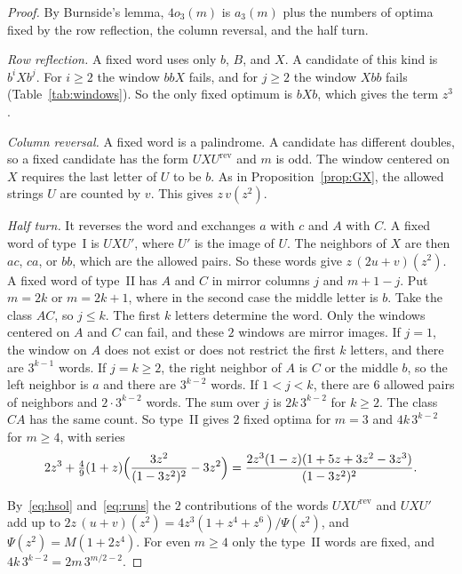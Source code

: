 \begin{proof}
By Burnside's lemma, $4o_3(m)$ is $a_3(m)$ plus the numbers of optima fixed by
the row reflection, the column reversal, and the half turn.

\emph{Row reflection.} A fixed word uses only $b$, $B$, and $X$. A candidate of
this kind is $b^iXb^j$. For $i\ge2$ the window $bbX$ fails, and for $j\ge2$ the
window $Xbb$ fails (Table~\ref{tab:windows}). So the only fixed optimum is
$bXb$, which gives the term $z^3$.

\emph{Column reversal.} A fixed word is a palindrome. A candidate has
different doubles, so a fixed candidate has the form $UXU^{\mathrm{rev}}$ and
$m$ is odd. The window centered on $X$ requires the last letter of $U$ to be
$b$. As in Proposition~\ref{prop:GX}, the allowed strings $U$ are counted by
$v$. This gives $z\,v(z^2)$.

\emph{Half turn.} It reverses the word and exchanges $a$ with $c$ and $A$ with
$C$. A fixed word of type~I is $UXU'$, where $U'$ is the image of $U$. The
neighbors of $X$ are then $ac$, $ca$, or $bb$, which are the allowed pairs. So
these words give $z\,(2u+v)(z^2)$. A fixed word of type~II has $A$ and $C$ in
mirror columns $j$ and $m+1-j$. Put $m=2k$ or $m=2k+1$, where in the second
case the middle letter is $b$. Take the class $AC$, so $j\le k$. The first $k$
letters determine the word. Only the windows centered on $A$ and $C$ can fail,
and these $2$ windows are mirror images. If $j=1$, the window on $A$ does not
exist or does not restrict the first $k$ letters, and there are $3^{k-1}$
words. If $j=k\ge2$, the right neighbor of $A$ is $C$ or the middle $b$, so the
left neighbor is $a$ and there are $3^{k-2}$ words. If $1<j<k$, there are
$6$ allowed pairs of neighbors and $2\cdot3^{k-2}$ words. The sum over $j$ is
$2k\,3^{k-2}$ for $k\ge2$. The class $CA$ has the same count. So type~II
gives $2$ fixed optima for $m=3$ and $4k\,3^{k-2}$ for $m\ge4$, with series
\[
2z^3+\tfrac49(1+z)\Bigl(\frac{3z^2}{(1-3z^2)^2}-3z^2\Bigr)
=\frac{2z^3(1-z)(1+5z+3z^2-3z^3)}{(1-3z^2)^2}.
\]

By~\eqref{eq:hsol} and~\eqref{eq:runs} the $2$ contributions of the words
$UXU^{\mathrm{rev}}$ and $UXU'$ add up to
$2z\,(u+v)(z^2)=4z^3(1+z^4+z^6)/\Psi(z^2)$, and $\Psi(z^2)=M(1+2z^4)$. For even
$m\ge4$ only the type~II words are fixed, and $4k\,3^{k-2}=2m\,3^{m/2-2}$.
\end{proof}
